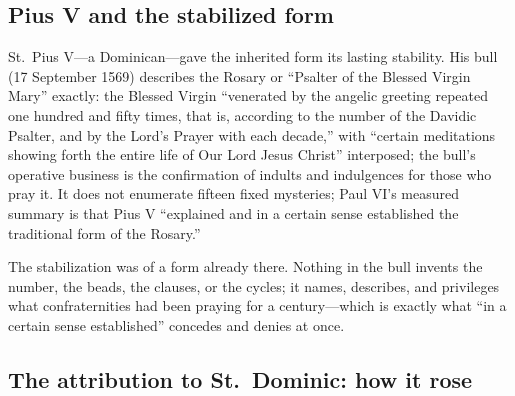 \subsection{Pius V and the stabilized form}

St.~Pius V---a Dominican---gave the inherited form its lasting
stability. His bull  (17 September
1569) describes the Rosary or ``Psalter of the Blessed Virgin Mary''
exactly: the Blessed Virgin ``venerated by the angelic greeting repeated
one hundred and fifty times, that is, according to the number of the
Davidic Psalter, and by the Lord's Prayer with each decade,'' with
``certain meditations showing forth the entire life of Our Lord Jesus
Christ'' interposed; the bull's operative business is the confirmation
of indults and indulgences for those who pray it. It does not enumerate
fifteen fixed mysteries; Paul VI's measured summary is that Pius V
``explained and in a certain sense established the traditional form of
the Rosary.''

The stabilization was of a form already there. Nothing in the bull
invents the number, the beads, the clauses, or the cycles; it names,
describes, and privileges what confraternities had been praying for a
century---which is exactly what ``in a certain sense established''
concedes and denies at once.

\subsection{The attribution to St.~Dominic: how it rose}

